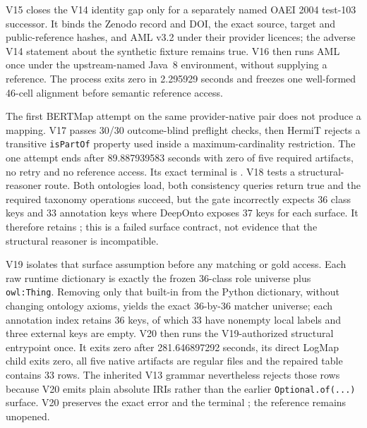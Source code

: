V15 closes the V14 identity gap only for a separately named OAEI 2004
test-103 successor. It binds the Zenodo record and DOI, the exact source,
target and public-reference hashes, and AML v3.2 under their provider licences;
the adverse V14 statement about the synthetic fixture remains true. V16 then
runs AML once under the upstream-named Java~8 environment, without supplying a
reference. The process exits zero in 2.295929 seconds and freezes one
well-formed 46-cell alignment before semantic reference access.

The first BERTMap attempt on the same provider-native pair does not produce a
mapping. V17 passes 30/30 outcome-blind preflight checks, then HermiT rejects a
transitive \texttt{isPartOf} property used inside a maximum-cardinality
restriction. The one attempt ends after 89.887939583 seconds with zero of five
required artifacts, no retry and no reference access. Its exact terminal is
.
V18 tests a structural-reasoner route. Both ontologies load, both consistency
queries return true and the required taxonomy operations succeed, but the gate
incorrectly expects 36 class keys and 33 annotation keys where DeepOnto exposes
37 keys for each surface. It therefore retains
;
this is a failed surface contract, not evidence that the structural reasoner is
incompatible.

V19 isolates that surface assumption before any matching or gold access. Each
raw runtime dictionary is exactly the frozen 36-class role universe plus
\texttt{owl:Thing}. Removing only that built-in from the Python dictionary,
without changing ontology axioms, yields the exact 36-by-36 matcher universe;
each annotation index retains 36 keys, of which 33 have nonempty local labels
and three external keys are empty. V20 then runs the V19-authorized structural
entrypoint once. It exits zero after 281.646897292 seconds, its direct LogMap
child exits zero, all five native artifacts are regular files and the repaired
table contains 33 rows. The inherited V13 grammar nevertheless rejects those
rows because V20 emits plain absolute IRIs rather than the earlier
\texttt{Optional.of(...)} surface. V20 preserves the exact error
 and the
terminal
;
the reference remains unopened.

